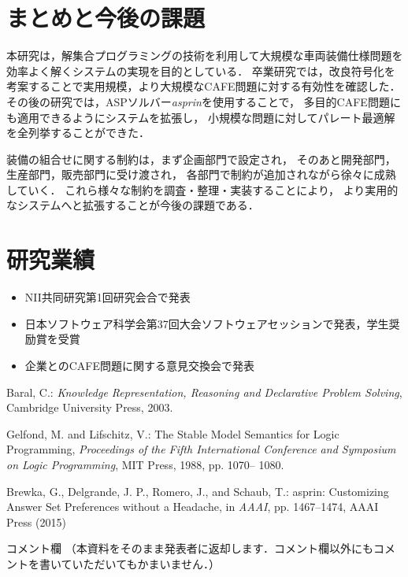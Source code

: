 \documentclass[a4j,10pt]{jarticle}
\begin{document}
\begin{multicols}{1}
\section{まとめと今後の課題}
本研究は，解集合プログラミングの技術を利用して大規模な車両装備仕様問題を
効率よく解くシステムの実現を目的としている．
卒業研究では，改良符号化を考案することで実用規模，より大規模なCAFE問題に対する有効性を確認した．
その後の研究では，ASPソルバー{\it asprin}を使用することで，
多目的CAFE問題にも適用できるようにシステムを拡張し，
小規模な問題に対してパレート最適解を全列挙することができた．

装備の組合せに関する制約は，まず企画部門で設定され，
そのあと開発部門，生産部門，販売部門に受け渡され，
各部門で制約が追加されながら徐々に成熟していく．
これら様々な制約を調査・整理・実装することにより，
より実用的なシステムへと拡張することが今後の課題である．

\section{研究業績}
\begin{itemize}
 \item NII共同研究第1回研究会合で発表
 \item 日本ソフトウェア科学会第37回大会ソフトウェアセッションで発表，学生奨励賞を受賞
 \item 企業とのCAFE問題に関する意見交換会で発表
\end{itemize}


\begin{thebibliography}{10}

 Baral, C.: {\it Knowledge Representation, Reasoning and Declarative Problem Solving}, Cambridge University Press, 2003.

 Gelfond, M. and Lifschitz, V.: The Stable Model Semantics for Logic Programming, {\it Proceedings of the Fifth International Conference and Symposium on Logic Programming}, MIT Press, 1988, pp. 1070– 1080.

Brewka, G., Delgrande, J. P., Romero, J., and Schaub, T.: asprin: Customizing Answer Set Preferences without a Headache, in {\it AAAI}, pp. 1467–1474, AAAI Press (2015)
\end{thebibliography}

\end{multicols}
\vfill
\noindent
{\gt コメント欄}
{\footnotesize
（本資料をそのまま発表者に返却します．コメント欄以外にもコメントを書いていただいてもかまいません．）}
\\
\fbox{\begin{minipage}{\textwidth}\noindent\\\\\end{minipage}}	
\end{document}
